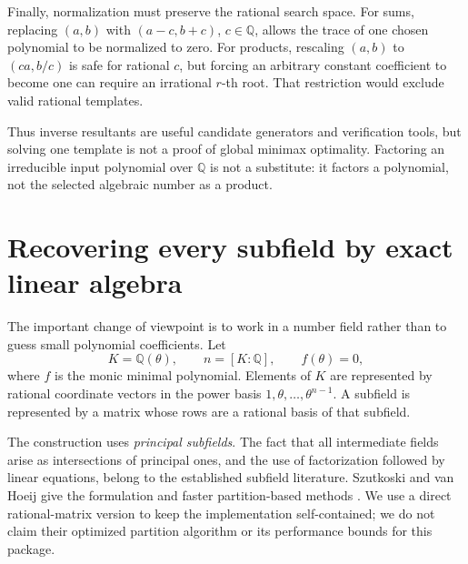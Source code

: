 \documentclass[11pt,letterpaper]{article}
\theoremstyle{definition}
\theoremstyle{remark}
\newcommand{\Q}{\mathbb Q}
\begin{document}
Finally, normalization must preserve the rational search space. For sums,
replacing \((a,b)\) with \((a-c,b+c)\), \(c\in\Q\), allows the trace of
one chosen polynomial to be normalized to zero. For products, rescaling
\((a,b)\) to \((ca,b/c)\) is safe for rational \(c\), but forcing an
arbitrary constant coefficient to become one can require an irrational
\(r\)-th root. That restriction would exclude valid rational templates.

Thus inverse resultants are useful candidate generators and verification
tools, but solving one template is not a proof of global minimax optimality.
Factoring an irreducible input polynomial over \(\Q\) is not a substitute:
it factors a polynomial, not the selected algebraic number as a product.

\section{Recovering every subfield by exact linear algebra}
\label{sec:subfields}
The important change of viewpoint is to work in a number field rather than
to guess small polynomial coefficients. Let
\[
 K=\Q(\theta),\qquad n=[K:\Q],\qquad f(\theta)=0,
\]
where \(f\) is the monic minimal polynomial. Elements of \(K\) are represented
by rational coordinate vectors in the power basis
\(1,\theta,\ldots,\theta^{n-1}\). A subfield is represented by a matrix
whose rows are a rational basis of that subfield.

The construction uses \emph{principal subfields}. The fact that all
intermediate fields arise as intersections of principal ones, and the use
of factorization followed by linear equations, belong to the established
subfield literature. Szutkoski and van Hoeij give the formulation and faster
partition-based methods \cite{szutkoski}. We use a direct rational-matrix
version to keep the implementation self-contained; we do not claim their
optimized partition algorithm or its performance bounds for this package.
\end{document}
